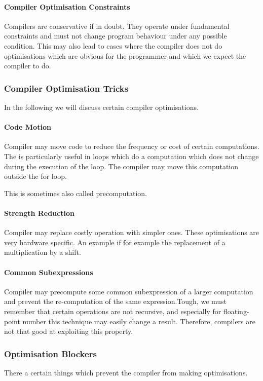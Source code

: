 \paragraph{Compiler Optimisation Constraints}
Compilers are conservative if in doubt. They operate under fundamental constraints and must not change program behaviour under any possible condition. This may also lead to cases where the compiler does not do optimisations which are obvious for the programmer and which we expect the compiler to do. 

\subsubsection{Compiler Optimisation Tricks}
In the following we will discuss certain compiler optimisations.

\paragraph{Code Motion}
Compiler may move code to reduce the frequency or cost of certain computations. The is particularly useful in loops which do a computation which does not change during the execution of the loop. The compiler may move this computation outside the for loop.

This is sometimes also called precomputation.

\paragraph{Strength Reduction}
Compiler may replace costly operation with simpler ones. These optimisations are very hardware specific. An example if for example the replacement of a multiplication by a shift.

\paragraph{Common Subexpressions}
Compiler may precompute some common subexpression of a larger computation and prevent the re-computation of the same expression.Tough, we must remember that certain operations are not recursive, and especially for floating-point number this technique may easily change a result. Therefore, compilers are not that good at exploiting this property.

\subsubsection{Optimisation Blockers}
There a certain things which prevent the compiler from making optimisations.

